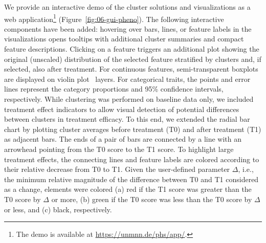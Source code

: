 \documentclass[
  oneside]{book}
\begin{document}
We provide an interactive demo of the cluster solutions and visualizations as a web application\footnote{The demo is available at \url{https://unmnn.de/phs/app/}.} (Figure~\ref{fig:06-gui-pheno}).
The following interactive components have been added:
hovering over bars, lines, or feature labels in the visualizations opens tooltips with additional cluster summaries and compact feature descriptions.
Clicking on a feature triggers an additional plot showing the original (unscaled) distribution of the selected feature stratified by clusters and, if selected, also after treatment.
For continuous features, semi-transparent boxplots are displayed on violin plot~\autocite{Hintze:Violin1998} layers.
For categorical traits, the points and error lines represent the category proportions and 95\% confidence intervals, respectively.
While clustering was performed on baseline data only, we included treatment effect indicators to allow visual detection of potential differences between clusters in treatment efficacy.
To this end, we extended the radial bar chart by plotting cluster averages before treatment (T0) and after treatment (T1) as adjacent bars.
The ends of a pair of bars are connected by a line with an arrowhead pointing from the T0 score to the T1 score.
To highlight large treatment effects, the connecting lines and feature labels are colored according to their relative decrease from T0 to T1.
Given the user-defined parameter \(\Delta\), i.e., the minimum relative magnitude of the difference between T0 and T1 considered as a change, elements were colored (a) red if the T1 score was greater than the T0 score by \(\Delta\) or more, (b) green if the T0 score was less than the T0 score by \(\Delta\) or less, and (c) black, respectively.
\end{document}
